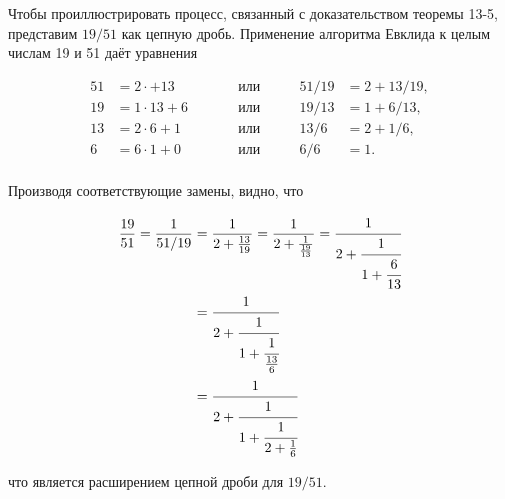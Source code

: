\documentclass{article}
\begin{document}
\indent Чтобы проиллюстрировать процесс, связанный с доказательством теоремы 13-5, представим $19/51$ как цепную дробь. Применение алгоритма Евклида к целым числам 19 и 51 даёт уравнения

\begin{center}
	\begin{align*}
		51&=2\cdot+13\qquad &&\text{или}& \qquad 51/19&=2+13/19,\\
		19&=1\cdot13+6\qquad &&\text{или}& \qquad 19/13&=1+6/13,\\
		13&=2\cdot6+1\qquad &&\text{или}& \qquad 13/6&=2+1/6,\\
		6&=6\cdot1+0\qquad &&\text{или}& \qquad 6/6&=1.\\
	\end{align*}
\end{center}

Производя соответствующие замены, видно, что

\begin{center}
	\begin{align*}
	\frac{19}{51}=\frac{1}{51/19}&=\frac{1}{2+\frac{13}{19}}
	=\frac{1}{2+\frac{1}{\frac{19}{13}}}
	=\cfrac{1}{2+\cfrac{1}{1+\cfrac{6}{13}}}\\
	&=\cfrac{1}{2+\cfrac{1}{1+\cfrac{1}{\frac{13}{6}}}}\\
	&=\cfrac{1}{2+\cfrac{1}{1+\cfrac{1}{2+\frac{1}{6}}}}\\
	\end{align*}
\end{center}

\noindent что является расширением цепной дроби для $19/51$.
	
\end{document}
